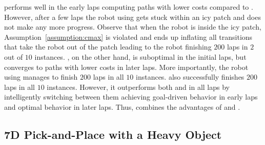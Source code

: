 \cmax{} performs
well in the early laps computing paths with lower costs compared to
\cmaxpp{}. However, after a few laps the robot using \cmax{} gets
stuck within an icy patch and does not make any more progress. Observe
that when the robot is inside the icy patch,
Assumption~\ref{assumption:cmax} is violated and \cmax{} ends up
inflating all transitions that take the robot out of the patch leading
to the robot finishing $200$ laps in $2$ out of $10$
instances. \cmaxpp{}, on the other hand, is suboptimal in the initial
laps, but converges to paths with lower costs in later
laps. More importantly, the robot using \cmaxpp{} manages to finish
$200$ laps in all $10$ instances. \acmaxpp{} also successfully
finishes $200$ laps in all $10$ instances. However, it 
outperforms both \cmax{} and \cmaxpp{} in all laps by intelligently switching between them achieving goal-driven behavior in early laps and optimal behavior in later laps.
Thus, \acmaxpp{} combines the
advantages of \cmax{} and \cmaxpp{}.



\subsection{7D Pick-and-Place with a Heavy Object}
\label{sec:simulated-7d-pick}

